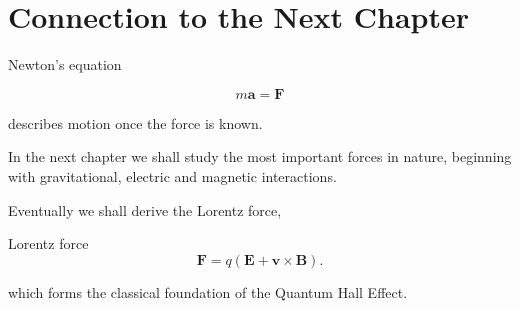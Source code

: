 \section{Connection to the Next Chapter}

Newton's equation

\[
m\mathbf a=\mathbf F
\]

describes motion once the force is known.

In the next chapter we shall study the most important forces in nature,
beginning with gravitational, electric and magnetic interactions.

Eventually we shall derive the Lorentz force,

\begin{keyequation}{Lorentz force}
\[
\mathbf F=q(\mathbf E+\mathbf v\times\mathbf B).
\]
\end{keyequation}

which forms the classical foundation of the Quantum Hall Effect.

